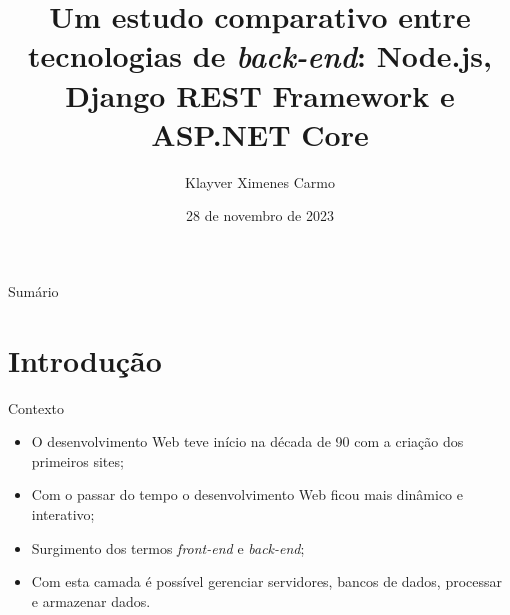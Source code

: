 \documentclass{libs/ufc_format}
\title[Trabalho de Conclusão de Curso]{\textbf{Um estudo comparativo entre tecnologias de \textit{back-end}: Node.js, Django REST Framework e ASP.NET Core}}
\author{Klayver Ximenes Carmo}
\institute[UFC]{
    \orientador{Prof. Dr. Fischer Jônatas Ferreira}
    \newline
    \department{Curso de graduação em Engenharia de Computação}
    \newline
    \ufc
}
\date{28 de novembro de 2023}
\begin{document}


\begin{frame}{}
    \maketitle
\end{frame}

\begin{frame}{Sumário}
        \tableofcontents
\end{frame}

\section{Introdução}

\begin{frame}{Contexto}
    \begin{itemize}
        \item O desenvolvimento Web teve início na década de 90 com a criação dos primeiros sites;
        \vspace*{0.5em}
        \item Com o passar do tempo o desenvolvimento Web ficou mais dinâmico e interativo;
        \vspace*{0.5em}
        \item Surgimento dos termos \textit{front-end} e \textit{back-end};
        \vspace*{0.5em}
        \item Com esta camada é possível gerenciar servidores, bancos de dados, processar e armazenar dados.
    \end{itemize}
\end{frame}
\end{document}
